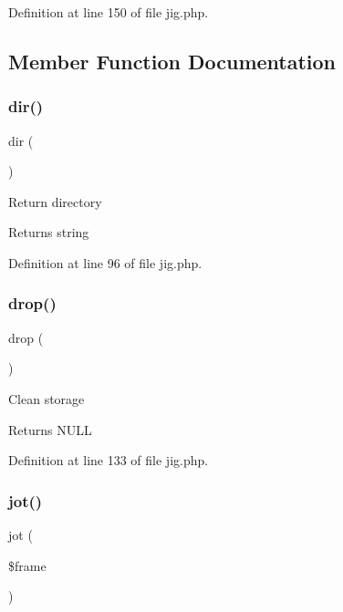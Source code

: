 Definition at line 150 of file jig.\+php.



\subsection{Member Function Documentation}
\hypertarget{class_d_b_1_1_jig_a17cfff4e7aae63d66e06be93dcf3ea31}{}\label{class_d_b_1_1_jig_a17cfff4e7aae63d66e06be93dcf3ea31} 
\subsubsection{\texorpdfstring{dir()}{dir()}}
{\footnotesize\ttfamily dir (\begin{DoxyParamCaption}{ }\end{DoxyParamCaption})}

Return directory \begin{DoxyReturn}{Returns}
string 
\end{DoxyReturn}


Definition at line 96 of file jig.\+php.

\hypertarget{class_d_b_1_1_jig_aeb639e5b2b713ed87ab8f2033af98ae8}{}\label{class_d_b_1_1_jig_aeb639e5b2b713ed87ab8f2033af98ae8} 
\subsubsection{\texorpdfstring{drop()}{drop()}}
{\footnotesize\ttfamily drop (\begin{DoxyParamCaption}{ }\end{DoxyParamCaption})}

Clean storage \begin{DoxyReturn}{Returns}
N\+U\+LL 
\end{DoxyReturn}


Definition at line 133 of file jig.\+php.

\hypertarget{class_d_b_1_1_jig_ab165454e8fcb681f401a76fc77eab8e6}{}\label{class_d_b_1_1_jig_ab165454e8fcb681f401a76fc77eab8e6} 
\subsubsection{\texorpdfstring{jot()}{jot()}}
{\footnotesize\ttfamily jot (\begin{DoxyParamCaption}\item[{}]{\$frame }\end{DoxyParamCaption})}

